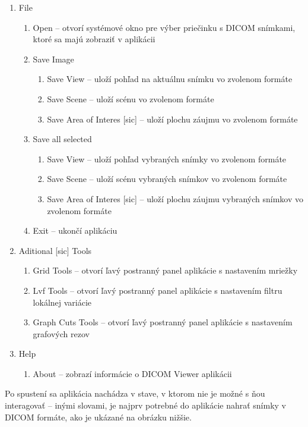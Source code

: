 {\begin {enumerate}
\item {File}
	\begin {enumerate}
		\item {Open -- otvorí systémové okno pre výber priečinku s DICOM snímkami, ktoré sa majú zobraziť v aplikácii}
		\item {Save Image}
		\begin {enumerate}
			\item {Save View -- uloží pohľad na aktuálnu snímku vo zvolenom formáte}
			\item {Save Scene -- uloží scénu vo zvolenom formáte}
			\item {Save Area of Interes [sic] -- uloží plochu záujmu vo zvolenom formáte}
		\end {enumerate}
	\item {Save all selected}
		\begin {enumerate}
			\item {Save View -- uloží pohľad vybraných snímky vo zvolenom formáte}
			\item {Save Scene -- uloží scénu vybraných snímkov vo zvolenom formáte}
			\item {Save Area of Interes [sic] -- uloží plochu záujmu vybraných snímkov vo zvolenom formáte}
		\end {enumerate}	
	\item {Exit -- ukončí aplikáciu}
	\end {enumerate}
\item {Aditional [sic] Tools}
	\begin {enumerate}
	\item {Grid Tools -- otvorí ľavý postranný panel aplikácie s nastavením mriežky}
	\item {Lvf Tools -- otvorí ľavý postranný panel aplikácie s nastavením filtru lokálnej variácie}
	\item {Graph Cuts Tools -- otvorí ľavý postranný panel aplikácie s nastavením grafových rezov}
	\end {enumerate}
\item {Help}
	\begin {enumerate}
	\item {About -- zobrazí informácie o DICOM Viewer aplikácii}
	\end {enumerate}
\end {enumerate}

Po spustení sa aplikácia nachádza v stave, v ktorom nie je možné s ňou interagovať -- inými slovami, je najprv potrebné do aplikácie nahrať snímky v DICOM formáte, ako je ukázané na obrázku nižšie.

}
